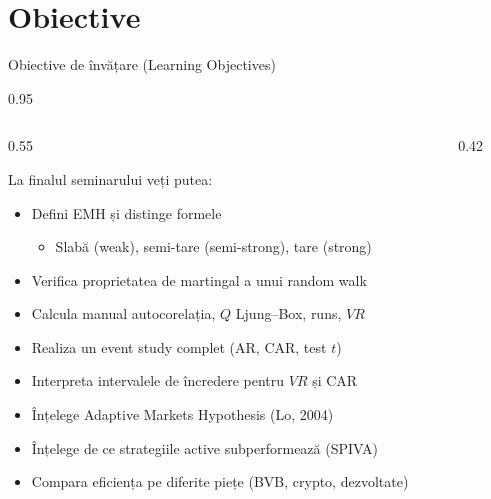 \documentclass[9pt, aspectratio=169, t]{beamer}
\begin{document}
\section{Obiective}

\begin{frame}[shrink=15]{Obiective de învățare (Learning Objectives)}
\begin{cminipage}{0.95\textwidth}
\begin{columns}[T]
\begin{column}{0.55\textwidth}
\begin{block}{La finalul seminarului veți putea:}
\begin{itemize}\setlength{\itemsep}{0pt}
    \item Defini EMH și distinge formele
    \begin{itemize}\setlength{\itemsep}{0pt}
        \item Slabă (weak), semi-tare (semi-strong), tare (strong)
    \end{itemize}
    \item Verifica proprietatea de martingal a unui random walk
    \item Calcula manual autocorelația, $Q$ Ljung--Box, runs, $VR$
    \item Realiza un event study complet (AR, CAR, test $t$)
    \item Interpreta intervalele de încredere pentru $VR$ și CAR
    \item Înțelege Adaptive Markets Hypothesis (Lo, 2004)
    \item Înțelege de ce strategiile active subperformează (SPIVA)
    \item Compara eficiența pe diferite piețe (BVB, crypto, dezvoltate)
\end{itemize}
\end{block}
\end{column}
\begin{column}{0.42\textwidth}
\begin{center}
\end{center}
\end{column}
\end{columns}
\end{cminipage}
\end{frame}
\end{document}
